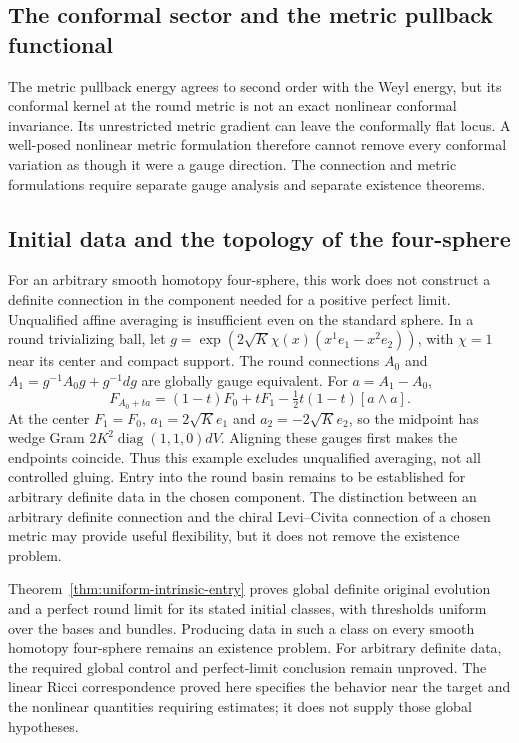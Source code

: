 \documentclass[11pt]{article}
\numberwithin{equation}{section}
\theoremstyle{definition}
\theoremstyle{remark}
\begin{document}
\subsection{The conformal sector and the metric pullback functional}
The metric pullback energy agrees to second order with the Weyl energy, but its conformal kernel at the round metric is not an exact nonlinear conformal invariance. Its unrestricted metric gradient can leave the conformally flat locus. A well-posed nonlinear metric formulation therefore cannot remove every conformal variation as though it were a gauge direction. The connection and metric formulations require separate gauge analysis and separate existence theorems.

\subsection{Initial data and the topology of the four-sphere}
For an arbitrary smooth homotopy four-sphere, this work does not construct a definite connection in the component needed for a positive perfect limit. Unqualified affine averaging is insufficient even on the standard sphere. In a round trivializing ball, let
$g=\exp(2\sqrt K\chi(x)(x^1e_1-x^2e_2))$, with $\chi=1$ near its center and compact support. The round connections $A_0$ and $A_1=g^{-1}A_0g+g^{-1}dg$ are globally gauge equivalent. For $a=A_1-A_0$,
\[
 F_{A_0+ta}=(1-t)F_0+tF_1-\tfrac12t(1-t)[a\wedge a].
\]
At the center $F_1=F_0$, $a_1=2\sqrt K e_1$ and $a_2=-2\sqrt K e_2$, so the midpoint has wedge Gram $2K^2\operatorname{diag}(1,1,0)dV$. Aligning these gauges first makes the endpoints coincide. Thus this example excludes unqualified averaging, not all controlled gluing.  Entry into the round basin remains to be established for arbitrary definite data in the chosen component. The distinction between an arbitrary definite connection and the chiral Levi--Civita connection of a chosen metric may provide useful flexibility, but it does not remove the existence problem.

Theorem~\ref{thm:uniform-intrinsic-entry} proves global definite original evolution and a perfect round limit for its stated initial classes, with thresholds uniform over the bases and bundles. Producing data in such a class on every smooth homotopy four-sphere remains an existence problem. For arbitrary definite data, the required global control and perfect-limit conclusion remain unproved. The linear Ricci correspondence proved here specifies the behavior near the target and the nonlinear quantities requiring estimates; it does not supply those global hypotheses.
\end{document}
